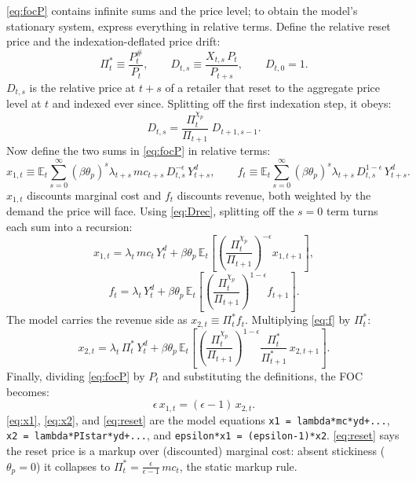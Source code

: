 \documentclass[11pt]{article}
\begin{document}
\eqref{eq:focP} contains infinite sums and the price level; to obtain the model's
stationary system, express everything in relative terms. Define the relative reset
price and the indexation-deflated price drift:
\begin{equation}\label{eq:defs}
    \Pi_t^{*} \equiv \frac{P_t^{\#}}{P_t}, \qquad
    D_{t,s} \equiv \frac{X_{t,s}\,P_t}{P_{t+s}}, \qquad D_{t,0} = 1.
\end{equation}
$D_{t,s}$ is the relative price at $t+s$ of a retailer that reset to the aggregate
price level at $t$ and indexed ever since. Splitting off the first indexation step,
it obeys:
\begin{equation}\label{eq:Drec}
    D_{t,s} = \frac{\Pi_t^{\chi_p}}{\Pi_{t+1}}\; D_{t+1,s-1}.
\end{equation}
Now define the two sums in \eqref{eq:focP} in relative terms:
\begin{equation}\label{eq:x1def}
    x_{1,t} \equiv \mathbb{E}_t \sum_{s=0}^{\infty}
    \left(\beta\theta_p\right)^{s} \lambda_{t+s}\, mc_{t+s}\, D_{t,s}^{-\epsilon}\,
    Y_{t+s}^{d}, \qquad
    f_{t} \equiv \mathbb{E}_t \sum_{s=0}^{\infty}
    \left(\beta\theta_p\right)^{s} \lambda_{t+s}\, D_{t,s}^{1-\epsilon}\,
    Y_{t+s}^{d}.
\end{equation}
$x_{1,t}$ discounts marginal cost and $f_t$ discounts revenue, both weighted by the
demand the price will face. Using \eqref{eq:Drec}, splitting off the $s=0$ term
turns each sum into a recursion:
\begin{equation}\label{eq:x1}
    x_{1,t} = \lambda_t\, mc_t\, Y_t^{d}
    + \beta\theta_p\, \mathbb{E}_t\!\left[
    \left(\frac{\Pi_t^{\chi_p}}{\Pi_{t+1}}\right)^{-\epsilon} x_{1,t+1}\right],
\end{equation}
\begin{equation}\label{eq:f}
    f_{t} = \lambda_t\, Y_t^{d}
    + \beta\theta_p\, \mathbb{E}_t\!\left[
    \left(\frac{\Pi_t^{\chi_p}}{\Pi_{t+1}}\right)^{1-\epsilon} f_{t+1}\right].
\end{equation}
The model carries the revenue side as $x_{2,t} \equiv \Pi_t^{*} f_t$. Multiplying
\eqref{eq:f} by $\Pi_t^{*}$:
\begin{equation}\label{eq:x2}
    x_{2,t} = \lambda_t\, \Pi_t^{*}\, Y_t^{d}
    + \beta\theta_p\, \mathbb{E}_t\!\left[
    \left(\frac{\Pi_t^{\chi_p}}{\Pi_{t+1}}\right)^{1-\epsilon}
    \frac{\Pi_t^{*}}{\Pi_{t+1}^{*}}\, x_{2,t+1}\right].
\end{equation}
Finally, dividing \eqref{eq:focP} by $P_t$ and substituting the definitions, the
FOC becomes:
\begin{equation}\label{eq:reset}
    \epsilon\, x_{1,t} = (\epsilon-1)\, x_{2,t}.
\end{equation}
\eqref{eq:x1}, \eqref{eq:x2}, and \eqref{eq:reset} are the model equations
\texttt{x1 = lambda*mc*yd+...}, \texttt{x2 = lambda*PIstar*yd+...}, and
\texttt{epsilon*x1 = (epsilon-1)*x2}. \eqref{eq:reset} says the reset price is a
markup over (discounted) marginal cost: absent stickiness
($\theta_p=0$) it collapses to
$\Pi_t^{*} = \tfrac{\epsilon}{\epsilon-1}\,mc_t$, the static markup rule.
\end{document}

